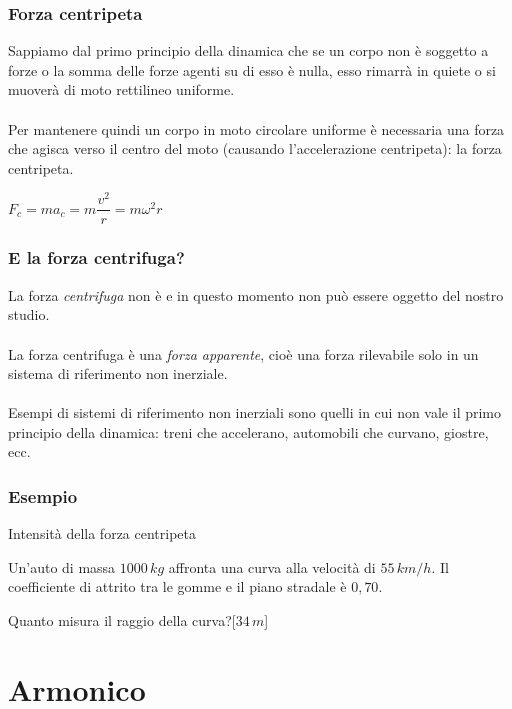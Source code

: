 \documentclass[]{beamer}
\theoremstyle{plain}
\begin{document}
\begin{frame}
  \frametitle{Forza centripeta}
  Sappiamo dal primo principio della dinamica che se un corpo non è soggetto a forze o la somma delle forze agenti su di esso è nulla, esso rimarrà in quiete o si muoverà di \alert<1>{moto rettilineo} uniforme.\\\pause~\\Per mantenere quindi un corpo in \alert<2>{moto circolare} uniforme è necessaria una forza che agisca verso il centro del moto (causando l'accelerazione centripeta): la \alert<2->{forza centripeta}.\pause
  \begin{center}
\colorbox{blue!30}{$ F_c = ma_c = m\dfrac{v^2}{r} = m\omega^2r $}
\end{center}
\end{frame}


\begin{frame}
  \frametitle{E la forza centrifuga?}
  La forza \emph{centrifuga} non è e in questo momento non può essere oggetto del nostro studio.\\\pause~\\  
  La forza centrifuga è una \emph{forza apparente}, cioè una forza rilevabile solo in un sistema di riferimento non inerziale.\\\pause~\\  
  Esempi di sistemi di riferimento non inerziali sono quelli in cui non vale il primo principio della dinamica: treni che accelerano, automobili che curvano, giostre, ecc.
\end{frame}


\begin{frame}
\frametitle{Esempio}
\begin{exampleblock}{Intensità della forza centripeta}
\small{Un'auto di massa $ 1000 \, kg $ affronta una curva alla velocità di $ 55 \, km/h $. Il coefficiente di attrito tra le gomme e il piano stradale è $ 0,70 $.

Quanto misura il raggio della curva?\hspace*{\fill}[$ 34 \, m $]}
\end{exampleblock}
\end{frame}



\section{Armonico}
\end{document}
